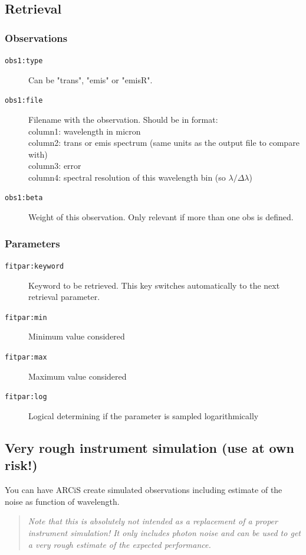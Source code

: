 \documentclass[12pt]{article}
\begin{document}
\subsection{Retrieval}

\subsubsection{Observations}

\begin{description}
\item[\texttt{obs1:type}]
Can be "trans", "emis" or "emisR".
\item[\texttt{obs1:file}]
Filename with the observation. Should be in format:\\
column1: wavelength in micron\\
column2: trans or emis spectrum (same units as the output file to compare with)\\
column3: error\\
column4: spectral resolution of this wavelength bin (so $\lambda/\Delta\lambda$)
\item[\texttt{obs1:beta}]
Weight of this observation. Only relevant if more than one obs is defined.
\end{description}

\subsubsection{Parameters}

\begin{description}
\item[\texttt{fitpar:keyword}]
Keyword to be retrieved. This key switches automatically to the next retrieval parameter.
\item[\texttt{fitpar:min}]
Minimum value considered
\item[\texttt{fitpar:max}]
Maximum value considered
\item[\texttt{fitpar:log}]
Logical determining if the parameter is sampled logarithmically
\end{description}

\subsection{Very rough instrument simulation (use at own risk!)}

You can have ARCiS create simulated observations including estimate of the noise as function of wavelength. 
\begin{quote}
\emph{Note that this is absolutely not intended as a replacement of a proper instrument simulation! It only includes photon noise and can be used to get a very rough estimate of the expected performance.}
\end{quote}
\end{document}
